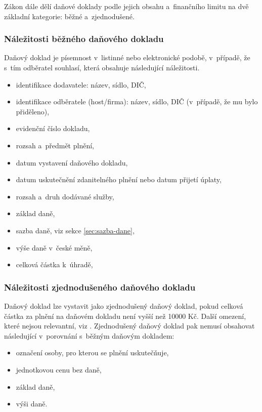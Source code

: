 Zákon dále dělí daňové doklady podle jejich obsahu a~finančního limitu na dvě základní kategorie: běžné a~zjednodušené.

\subsubsection{Náležitosti běžného daňového dokladu}
Daňový doklad je písemnost v~listinné nebo elektronické podobě, v~případě, že s~tím odběratel souhlasí, která obsahuje následující náležitosti.
\begin{itemize}
    \item identifikace dodavatele: název, sídlo, DIČ,
    \item identifikace odběratele (host/firma): název, sídlo, DIČ (v~případě, že mu bylo přiděleno),
    \item evidenční číslo dokladu,
    \item rozsah a~předmět plnění,
    \item datum vystavení daňového dokladu,
    \item datum uskutečnění zdanitelného plnění nebo datum přijetí úplaty,
    \item rozsah a~druh dodávané služby,
    \item základ daně,
    \item sazba daně, viz sekce \ref{sec:sazba-dane},
    \item výše daně v~české měně,
    \item celková částka k~úhradě,
\end{itemize}

\subsubsection{Náležitosti zjednodušeného daňového dokladu}
Daňový doklad lze vystavit jako zjednodušený daňový doklad, pokud celková částka za plnění na daňovém dokladu není vyšší než 10000 Kč.
Další omezení, které nejsou relevantní, viz \cite[\S~30 2]{cz-2004-235}.
Zjednodušený daňový doklad pak nemusí obsahovat následující v~porovnání s~běžným daňovým dokladem:
\begin{itemize}
    \item označení osoby, pro kterou se plnění uskutečňuje,
    \item jednotkovou cenu bez daně,
    \item základ daně,
    \item výši daně.
\end{itemize}

